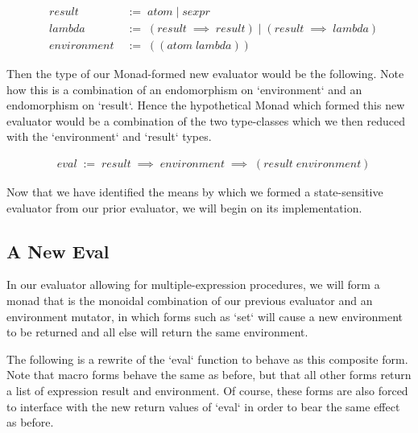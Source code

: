 \begin{align*}
& result \; &:= \; atom \; | \; sexpr
\\& lambda \; &:= \; (result \; \implies \; result) \; | \; (result \; \implies \; lambda)
\\& environment \; &:= \; ((atom \; lambda))
\end{align*}

Then the type of our Monad-formed new evaluator would be the following. Note
how this is a combination of an endomorphism on `environment` and an 
endomorphism on `result`. Hence the hypothetical Monad which formed this new
evaluator would be a combination of the two type-classes which we then
reduced with the `environment` and `result` types.

\begin{align*}
& eval \; := \; result \; \implies \; environment \; \implies \; (result \; environment)
\end{align*}

Now that we have identified the means by which we formed a state-sensitive
evaluator from our prior evaluator, we will begin on its implementation.

\subsection{A New Eval}
In our evaluator allowing for multiple-expression procedures, we will form a 
monad that is the monoidal combination of our previous evaluator and an 
environment mutator, in which forms such as `set` will cause a new
environment to be returned and all else will return the same environment.

The following is a rewrite of the `eval` function to behave as this composite
form. Note that macro forms behave the same as before, but that all other
forms return a list of expression result and environment. Of course, these
forms are also forced to interface with the new return values of `eval` in
order to bear the same effect as before.

